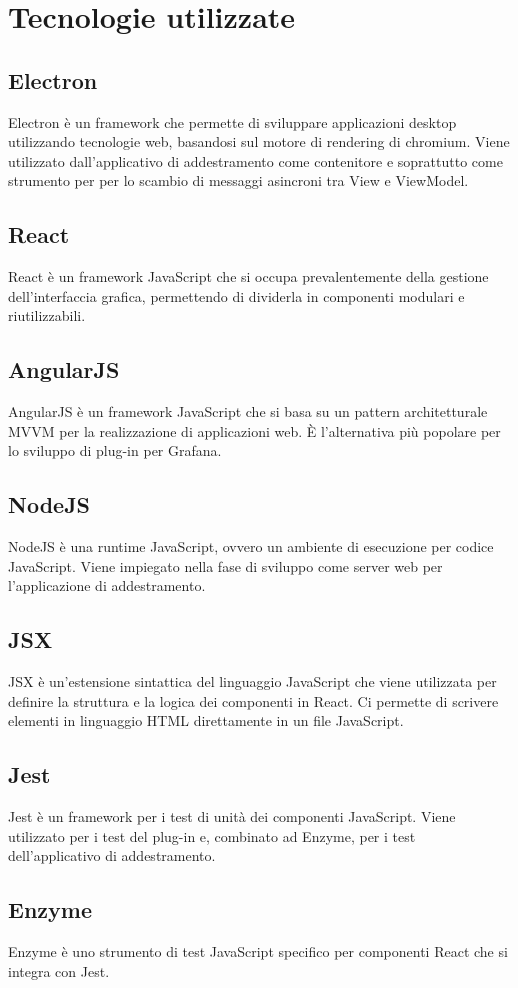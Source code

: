 \section{Tecnologie utilizzate}
	\subsection{Electron}
		Electron è un framework che permette di sviluppare applicazioni desktop utilizzando tecnologie web, basandosi sul motore di rendering di chromium. Viene utilizzato dall'applicativo di addestramento come contenitore e soprattutto come strumento per per lo scambio di messaggi asincroni tra View e ViewModel.
	\subsection{React}
		React è un framework JavaScript che si occupa prevalentemente della gestione dell'interfaccia grafica, permettendo di dividerla in componenti modulari e riutilizzabili.
	\subsection{AngularJS}
		AngularJS è un framework JavaScript che si basa su un pattern architetturale MVVM per la realizzazione di applicazioni web. È l'alternativa più popolare per lo sviluppo di plug-in per Grafana\glo.
	\subsection{NodeJS}
		NodeJS è una runtime JavaScript, ovvero un ambiente di esecuzione per codice JavaScript. Viene impiegato nella fase di sviluppo come server web per l'applicazione di addestramento.
	\subsection{JSX}
		JSX è un'estensione sintattica del linguaggio JavaScript che viene utilizzata per definire la struttura e la logica dei componenti in React. Ci permette di scrivere elementi in linguaggio HTML direttamente in un file JavaScript.
	\subsection{Jest}
		Jest è un framework per i test di unità dei componenti JavaScript. Viene utilizzato per i test del plug-in e, combinato ad Enzyme, per i test dell'applicativo di addestramento.
	\subsection{Enzyme}
		Enzyme è uno strumento di test JavaScript specifico per componenti React che si integra con Jest.

